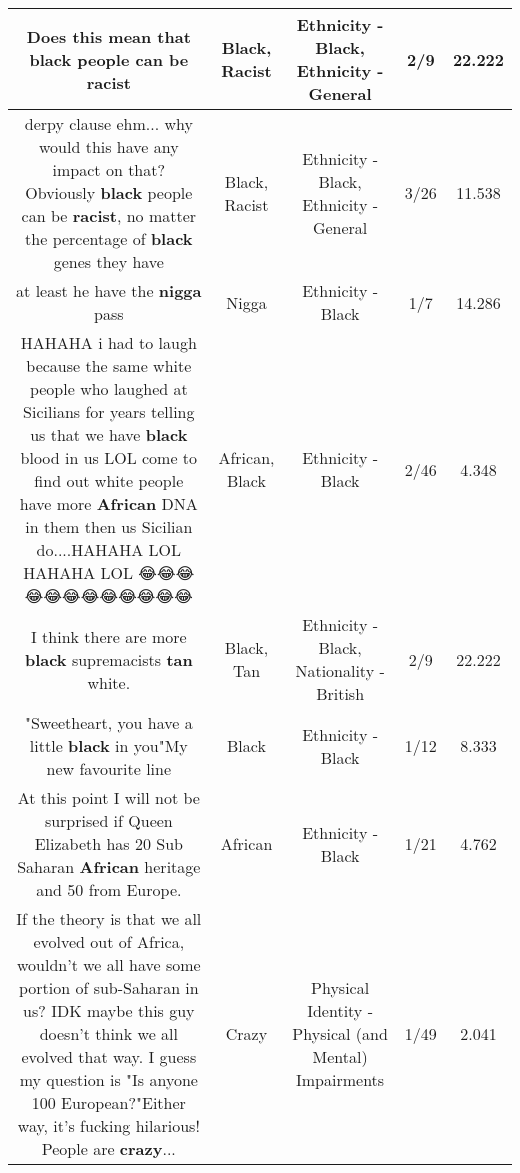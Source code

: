 \documentclass[11pt]{article}
\newlength\mylength
\begin{document}
\begin{center}
\begin{longtable}{|C{.65\mylength}|C{.30\mylength}|C{.12\mylength}|C{.12\mylength}|C{.12\mylength}|}
  \small Does this mean that \textbf{black} people can be racist\normalsize   & Black, Racist & Ethnicity - Black, Ethnicity - General & 2/9 & 22.222 \\  \hline
  \small derpy clause ehm... why would this have any impact on that? Obviously \textbf{black} people can be \textbf{racist}, no matter the percentage of \textbf{black} genes they have\normalsize   & Black, Racist & Ethnicity - Black, Ethnicity - General & 3/26 & 11.538 \\  \hline
  \small at least he have the \textbf{nigga} pass\normalsize   & Nigga & Ethnicity - Black & 1/7 & 14.286 \\  \hline
  \small HAHAHA i had to laugh because the same white people who laughed at Sicilians for years telling us that we have \textbf{black} blood in us LOL come to find out white people have more \textbf{African} DNA in them then us Sicilian do....HAHAHA LOL HAHAHA LOL 😂😂😂😂😂😂😂😂😂😂😂😂\normalsize   & African, Black & Ethnicity - Black & 2/46 & 4.348 \\  \hline
  \small I think there are more \textbf{black} supremacists \textbf{tan} white.\normalsize   & Black, Tan & Ethnicity - Black, Nationality - British & 2/9 & 22.222 \\  \hline
  \small "Sweetheart, you have a little \textbf{black} in you"My new favourite line\normalsize   & Black & Ethnicity - Black & 1/12 & 8.333 \\  \hline
  \small At this point I will not be surprised if Queen Elizabeth has 20 Sub Saharan  \textbf{African} heritage and 50 from Europe.\normalsize   & African & Ethnicity - Black & 1/21 & 4.762 \\  \hline
  \small If the theory is that we all evolved out of Africa, wouldn't we all have some portion of sub-Saharan in us?  IDK maybe this guy doesn't think we all evolved that way.  I guess my question is "Is anyone 100 European?"Either way, it's fucking hilarious!  People are \textbf{crazy}...\normalsize   & Crazy & Physical Identity - Physical (and Mental) Impairments & 1/49 & 2.041 \\  \hline

\end{longtable}
\end{center}
\end{document}
